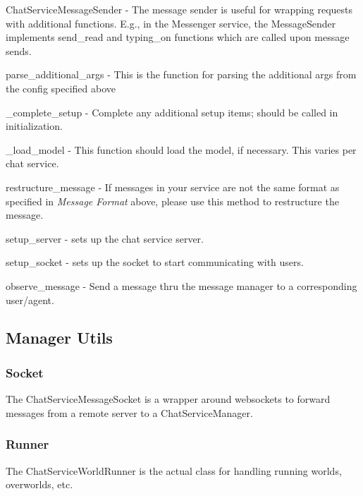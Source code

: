 \begin{DoxyEnumerate}
\item {\ttfamily Chat\+Service\+Message\+Sender} -\/ The message sender is useful for wrapping requests with additional functions. E.\+g., in the Messenger service, the {\ttfamily Message\+Sender} implements {\ttfamily send\+\_\+read} and {\ttfamily typing\+\_\+on} functions which are called upon message sends.
\item {\ttfamily parse\+\_\+additional\+\_\+args} -\/ This is the function for parsing the additional args from the config specified above
\item {\ttfamily \+\_\+complete\+\_\+setup} -\/ Complete any additional setup items; should be called in initialization.
\item {\ttfamily \+\_\+load\+\_\+model} -\/ This function should load the model, if necessary. This varies per chat service.
\item {\ttfamily restructure\+\_\+message} -\/ If messages in your service are not the same format as specified in {\itshape Message Format} above, please use this method to restructure the message.
\item {\ttfamily setup\+\_\+server} -\/ sets up the chat service server.
\item {\ttfamily setup\+\_\+socket} -\/ sets up the socket to start communicating with users.
\item {\ttfamily observe\+\_\+message} -\/ Send a message thru the message manager to a corresponding user/agent.
\end{DoxyEnumerate}

\subsection*{Manager Utils}

\subsubsection*{Socket}

The {\ttfamily Chat\+Service\+Message\+Socket} is a wrapper around websockets to forward messages from a remote server to a {\ttfamily Chat\+Service\+Manager}.

\subsubsection*{Runner}

The {\ttfamily Chat\+Service\+World\+Runner} is the actual class for handling running worlds, overworlds, etc.

